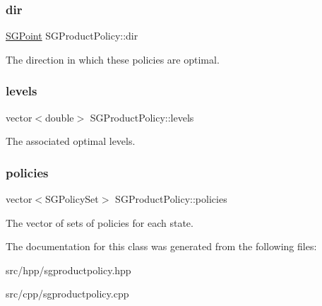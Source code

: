 \subsubsection{\texorpdfstring{dir}{dir}}
{\footnotesize\ttfamily \hyperlink{classSGPoint}{S\+G\+Point} S\+G\+Product\+Policy\+::dir\hspace{0.3cm}{\ttfamily [private]}}

The direction in which these policies are optimal. \mbox{\label{classSGProductPolicy_a2bc6dc794b3e3e74e6a84a9d4d3f47ec}} 
\subsubsection{\texorpdfstring{levels}{levels}}
{\footnotesize\ttfamily vector$<$double$>$ S\+G\+Product\+Policy\+::levels\hspace{0.3cm}{\ttfamily [private]}}

The associated optimal levels. \mbox{\label{classSGProductPolicy_abdf942313081ac619e2a2efe7bf1480d}} 
\subsubsection{\texorpdfstring{policies}{policies}}
{\footnotesize\ttfamily vector$<$S\+G\+Policy\+Set$>$ S\+G\+Product\+Policy\+::policies\hspace{0.3cm}{\ttfamily [private]}}

The vector of sets of policies for each state. 

The documentation for this class was generated from the following files\+:\begin{DoxyCompactItemize}
\item 
src/hpp/sgproductpolicy.\+hpp\item 
src/cpp/sgproductpolicy.\+cpp\end{DoxyCompactItemize}
